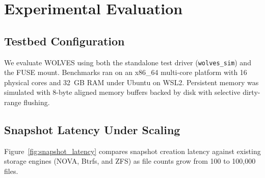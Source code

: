 \documentclass[conference]{IEEEtran}
\begin{document}
\begin{table}[t]
\caption{Mapping of POSIX File System Invocations to Immutable Package Operations}
\label{tab:posix_mapping}
\centering
{}
\end{table}

\section{Experimental Evaluation}

\subsection{Testbed Configuration}
We evaluate WOLVES using both the standalone test driver (\texttt{wolves\_sim}) and the FUSE mount. Benchmarks ran on an x86\_64 multi-core platform with 16 physical cores and 32~GB RAM under Ubuntu on WSL2. Persistent memory was simulated with 8-byte aligned memory buffers backed by disk with selective dirty-range flushing.

\subsection{Snapshot Latency Under Scaling}
Figure~\ref{fig:snapshot_latency} compares snapshot creation latency against existing storage engines (NOVA, Btrfs, and ZFS) as file counts grow from 100 to 100,000 files.
\end{document}
